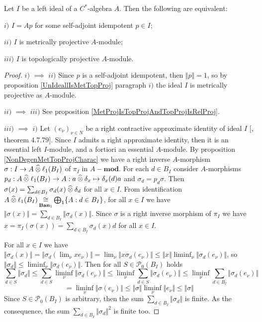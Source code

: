 \begin{theorem}\label{LeftIdealOfCStarAlgMetTopProjCharac} Let $I$ be a left ideal of a $C^*$-algebra $A$. Then the following are equivalent:

$i)$ $I=Ap$ for some self-adjoint idempotent $p\in I$;

$ii)$ $I$ is metrically projective $A$-module;

$iii)$ $I$ is topologically projective $A$-module.
\end{theorem}
\begin{proof} $i)$ $\implies$ $ii)$ Since $p$ is a self-adjoint idempotent, then $\Vert p\Vert=1$, so by proposition \ref{UnIdeallIsMetTopProj} paragraph $i)$ the ideal $I$ is metrically projective as $A$-module.

$ii)$ $\implies$ $iii)$ See proposition \ref{MetProjIsTopProjAndTopProjIsRelProj}.

$iii)$ $\implies$ $i)$ Let $(e_\nu)_{\nu\in N}$ be a right contractive approximate identity of ideal $I$ [\cite{HelBanLocConvAlg}, theorem 4.7.79]. Since $I$ admits a right approximate identity, then it is an essential left $I$-module, and a fortiori an essential $A$-module. By proposition \ref{NonDegenMetTopProjCharac} we have a right inverse $A$-morphism $\sigma:I\to A\mathbin{\widehat{\otimes}} \ell_1(B_I)$ of $\pi_I$ in $A-\mathbf{mod}$. For each $d\in B_I$ consider $A$-morphisms $p_d:A\mathbin{\widehat{\otimes}} \ell_1(B_I)\to A:a\mathbin{\widehat{\otimes}} \delta_x\mapsto \delta_x(d)a$ and $\sigma_d=p_d\sigma$. Then $\sigma(x)=\sum_{d\in B_I}\sigma_d(x)\mathbin{\widehat{\otimes}} \delta_d$ for all $x\in I$. From identification $A\mathbin{\widehat{\otimes}}\ell_1(B_I)\mathop{\mathbin{\cong}}\limits_{\mathbf{Ban}_1}\bigoplus_1\{ A:d\in B_I\}$, for all $x\in I$ we have $\Vert\sigma(x)\Vert=\sum_{d\in B_I} \Vert\sigma_d(x)\Vert$. Since $\sigma$ is a right inverse morphism of $\pi_I$ we have $x=\pi_I(\sigma(x))=\sum_{d\in B_I}\sigma_d(x)d$ for all $x\in I$. 

For all $x\in I$ we have
$\Vert\sigma_d(x)\Vert=\Vert\sigma_d(\lim_\nu xe_\nu)\Vert=\lim_\nu\Vert x\sigma_d(e_\nu)\Vert \leq\Vert x\Vert\liminf_\nu\Vert\sigma_d(e_\nu)\Vert$, so $\Vert\sigma_d\Vert\leq \liminf_\nu\Vert\sigma_d(e_\nu)\Vert$. Then for all $S\in\mathcal{P}_0(B_I)$ holds
$$
\sum_{d\in S}\Vert \sigma_d\Vert
\leq \sum_{d\in S}\liminf_\nu\Vert \sigma_d(e_\nu)\Vert
\leq \liminf_\nu\sum_{d\in S}\Vert \sigma_d(e_\nu)\Vert
\leq \liminf_\nu\sum_{d\in B_I}\Vert \sigma_d(e_\nu) \Vert
$$
$$
=\liminf_{\nu}\Vert\sigma(e_\nu)\Vert
\leq \Vert\sigma\Vert\liminf_{\nu}\Vert e_\nu\Vert
\leq \Vert\sigma\Vert
$$
Since $S\in \mathcal{P}_0(B_I)$ is arbitrary, then the sum $\sum_{d\in B_I}\Vert\sigma_d\Vert$ is finite. As the consequence, the sum $\sum_{d\in B_I}\Vert\sigma_d\Vert^2$ is finite too. 


\end{proof}
